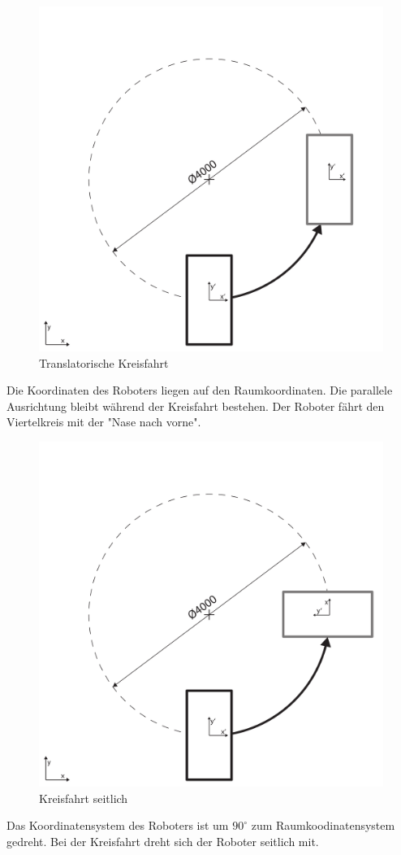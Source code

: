 \documentclass[a4paper]{article}
\begin{document}
\begin{figure}[H]
    \centering
    \includegraphics[width=.6\textwidth]{Viertelkreis-translatorisch}
    \caption{Translatorische Kreisfahrt}
\end{figure}
Die Koordinaten des Roboters liegen auf den Raumkoordinaten. Die parallele Ausrichtung bleibt während der Kreisfahrt bestehen. Der Roboter fährt den Viertelkreis mit der "Nase nach vorne".

\vspace{2cm}
\begin{figure}[H]
    \centering
    \includegraphics[width=.6\textwidth]{Viertelkreis-seitwaerts}
    \caption{Kreisfahrt seitlich}
\end{figure}
Das Koordinatensystem des Roboters ist um $90^\circ$ zum Raumkoodinatensystem gedreht. Bei der Kreisfahrt dreht sich der Roboter seitlich mit.


\end{document}
